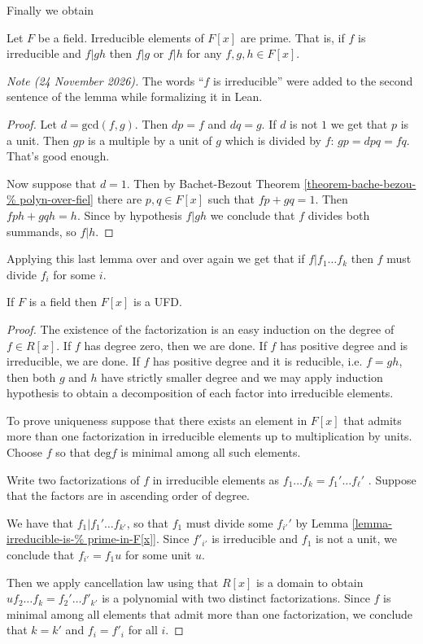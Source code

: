 Finally we obtain

\begin{lemma}
\label{lemma-irreducible-is-%
prime-in-F[x]}
Let $F$ be a field. Irreducible elements of
$F[x]$ are prime. That is,
if $f$ is irreducible and $f|gh$
then $f|g$ or $f|h$ for any $f,g,h \in F[x]$.
\end{lemma}

\medskip\noindent
{\it Note (24 November 2026).}
The words ``$f$ is irreducible'' were added
to the second sentence of the lemma
while formalizing it in Lean.

\begin{proof}
Let $d=\text{gcd}(f,g)$. Then $dp=f$ and
$dq=g$. If $d$ is not $1$
we get that $p$ is a unit. Then $gp$ is a
multiple by a unit of $g$ which is
divided by $f$: $gp=dpq=fq$. That's good
enough.

Now suppose that $d=1$. Then by
Bachet-Bezout
Theorem
\ref{theorem-bache-bezou-%
polyn-over-fiel}
there are $p,q \in F[x]$ such that $fp+gq=1$.
Then $fph+gqh=h$. Since by
hypothesis $f|gh$ we conclude that $f$
divides both summands, so $f|h$.
\end{proof}

Applying this last lemma over and over again
we get that if $f|f_1\ldots f_k$
then $f$ must divide $f_i$ for some $i$.

\begin{lemma}
\label{lemma-polynomials-over-%
fields-are-UFD}
If $F$ is a field then $F[x]$ is a UFD.
\end{lemma}

\begin{proof}
The existence of the factorization is an easy
induction on the degree of $f\in
R[x]$. If $f$ has degree zero, then we are
done. If $f$ has positive degree and
is irreducible, we are done. If $f$ has
positive degree and it is reducible,
i.e. $f=gh$, then both $g$ and $h$ have
strictly smaller degree and we may apply
induction hypothesis to obtain a
decomposition of each factor into irreducible
elements.

To prove uniqueness suppose that there exists
an element in $F[x]$ that admits
more than one factorization in irreducible
elements
up to multiplication by units. Choose $f$ so
that
$\text{deg}f$ is minimal among all such
elements.

Write two factorizations of $f$ in
irreducible elements as
$f_1\ldots f_k=f_1'\ldots f_\ell'$ . Suppose
that the factors are in
ascending order of degree.

We have that $f_1|f_1'\ldots f_{k'}$, so
that $f_1$ must divide some $f_{i'}'$
by Lemma
\ref{lemma-irreducible-is-%
prime-in-F[x]}.
Since $f'_{i'}$ is irreducible and $f_1$ is
not a unit, we conclude that $f_{i'}=f_1 u$
for some unit $u$.

Then we apply cancellation law using that
$R[x]$ is a domain
to obtain $uf_2\ldots f_k=f_2'\ldots f'_{k'}$
is a
polynomial with two distinct factorizations.
Since $f$ is minimal among all
elements that admit more than one
factorization, we conclude that $k=k'$ and
$f_i=f'_i$ for all $i$.
\end{proof}

